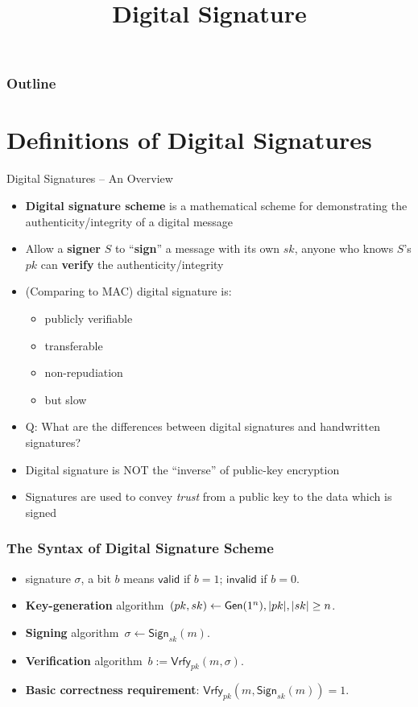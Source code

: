 

\title{Digital Signature}


\maketitle
\begin{frame}
\frametitle{Outline}
\tableofcontents
\end{frame}
\section{Definitions of Digital Signatures}
\begin{frame}{Digital Signatures -- An Overview}
\begin{itemize}
\item \textbf{Digital signature scheme} is a mathematical scheme for demonstrating the authenticity/integrity of a digital message
\item Allow a \textbf{signer} $S$ to ``\textbf{sign}'' a message with its own $sk$, anyone who knows $S$'s $pk$ can \textbf{verify} the authenticity/integrity
\item (Comparing to MAC) digital signature is:
\begin{itemize}
\item publicly verifiable
\item transferable
\item non-repudiation
\item but slow
\end{itemize}
\item \alert{Q: What are the differences between digital signatures and handwritten signatures?}
\item Digital signature is NOT the ``inverse'' of public-key encryption
\item Signatures are used to convey \emph{trust} from a public key to the data which is signed
\end{itemize}
\end{frame}
\begin{frame}\frametitle{The Syntax of Digital Signature Scheme}
\begin{figure}
\begin{center}

\end{center}
\end{figure}
\begin{itemize}
\item signature $\sigma$, a bit $b$ means $\mathsf{valid}$ if $b=1$; $\mathsf{invalid}$ if $b=0$.
\item \textbf{Key-generation} algorithm~$(pk,sk) \gets \mathsf{Gen}(1^n), \lvert pk\rvert,\lvert sk\rvert \ge n$.
\item \textbf{Signing} algorithm~$\sigma \gets \mathsf{Sign}_{sk}(m)$.
\item \textbf{Verification} algorithm~$b:= \mathsf{Vrfy}_{pk}(m,\sigma)$.
\item \textbf{Basic correctness requirement}: $\mathsf{Vrfy}_{pk}(m,\mathsf{Sign}_{sk}(m)) = 1$.
\end{itemize}
\end{frame}
